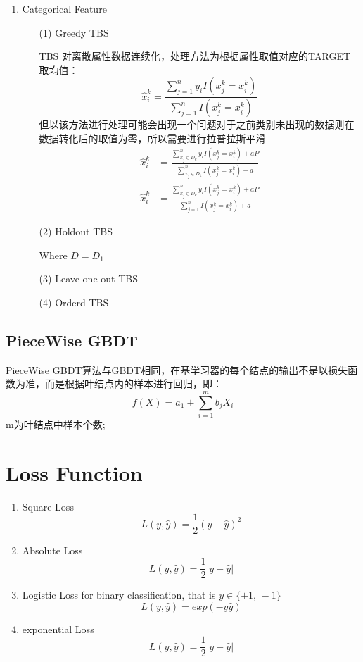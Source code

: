 \documentclass[a4paper]{article}
\begin{document}
\begin{enumerate}
			\item Categorical Feature\par
			\begin{itemize}
				\item[(1)] Greedy TBS\par
				TBS 对离散属性数据连续化，处理方法为根据属性取值对应的TARGET取均值：
				$$\hat{x}_i^k = \frac{\sum_{j=1}^n y_iI(x_j^k=x_i^k)}{\sum_{j=1}^n I(x_j^k=x_i^k)}$$
				但以该方法进行处理可能会出现一个问题对于之前类别未出现的数据则在数据转化后的取值为零，所以需要进行拉普拉斯平滑
				\begin{align*}
					\hat{x}_i^k & = \frac{\sum_{x_j \in D_k}^n y_iI(x_j^k=x_i^k)+aP}{\sum_{x_j \in D_k}^n I(x_j^k=x_i^k)+a}\\
					\hat{x}_i^k & =  \frac{\sum_{x_j \in D_k}^n y_iI(x_j^k=x_i^k)+aP}{\sum_{j=1}^n I(x_j^k=x_i^k)+a} 
				\end{align*}
				\item[(2)] Holdout TBS\par
					Where $D = D_1$
				\item[(3)] Leave one out TBS\par
				\item[(4)] Orderd TBS\par
			\end{itemize}
		\end{enumerate}
	\subsection{PieceWise GBDT}
	PieceWise GBDT算法与GBDT相同，在基学习器的每个结点的输出不是以损失函数为准，而是根据叶结点内的样本进行回归，即：
	$$f(X) = a_1 + \sum_{i=1}^{m}b_jX_i$$
	m为叶结点中样本个数;
\section{Loss Function}
	\begin{enumerate}
		\item Square Loss
			$$L(y,\hat{y}) = \frac{1}{2}(y-\hat{y})^2$$
		\item Absolute Loss
			$$L(y,\hat{y}) = \frac{1}{2}|y-\hat{y}|$$
		\item Logistic Loss for binary classification, that is $y \in \{+1,\,-1\}$
			$$L(y,\hat{y}) = exp(-y\hat{y})$$
		\item exponential Loss
			$$L(y,\hat{y}) = \frac{1}{2}|y-\hat{y}|$$
	\end{enumerate}
\end{document}

